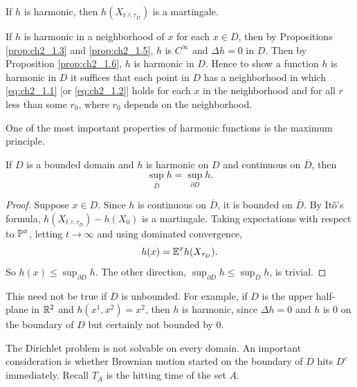 \begin{corollary}\label{cor:ch2_1.7}
If $h$ is harmonic, then $h(X_{t\wedge\tau_D})$ is a martingale.
\end{corollary}

If $h$ is harmonic in a neighborhood of $x$ for each $x \in D$, then by Propositions \ref{prop:ch2_1.3} and \ref{prop:ch2_1.5}, $h$ is $C^\infty$ and $\Delta h = 0$ in $D$. Then by Proposition \ref{prop:ch2_1.6}, $h$ is harmonic in $D$. Hence to show a function $h$ is harmonic in $D$ it suffices that each point in $D$ has a neighborhood in which \eqref{eq:ch2_1.1} [or \eqref{eq:ch2_1.2}] holds for each $x$ in the neighborhood and for all $r$ less than some $r_0$, where $r_0$ depends on the neighborhood.

One of the most important properties of harmonic functions is the maximum principle.

\begin{theorem}\label{thm:ch2_1.8}
If $D$ is a bounded domain and $h$ is harmonic on $D$ and continuous on $\overline{D}$, then
\[
    \sup_{\overline{D}} h = \sup_{\partial D} h.
\]
\end{theorem}

\begin{proof}
Suppose $x \in D$. Since $h$ is continuous on $\overline{D}$, it is bounded on $\overline{D}$. By It\^o's formula, $h(X_{t\wedge\tau_D}) - h(X_0)$ is a martingale. Taking expectations with respect to $\P^x$, letting $t \to \infty$ and using dominated convergence,
\begin{equation}\label{eq:ch2_1.11}
    h(x) = \E^x h(X_{\tau_D}).
\end{equation}
So $h(x) \leq \sup_{\partial D} h$. The other direction, $\sup_{\partial D} h \leq \sup_{\overline{D}} h$, is trivial.
\end{proof}

This need not be true if $D$ is unbounded. For example, if $D$ is the upper half-plane in $\R^2$ and $h(x^1,x^2) = x^2$, then $h$ is harmonic, since $\Delta h = 0$ and $h$ is $0$ on the boundary of $D$ but certainly not bounded by $0$.



The Dirichlet problem is not solvable on every domain. An important consideration is whether Brownian motion started on the boundary of $D$ hits $D^c$ immediately. Recall $T_A$ is the hitting time of the set $A$.

